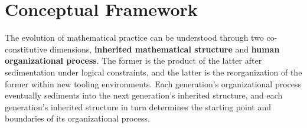\section{Conceptual Framework}

The evolution of mathematical practice can be understood through two co-constitutive dimensions, \textbf{inherited mathematical structure} and \textbf{human organizational process}. The former is the product of the latter after sedimentation under logical constraints, and the latter is the reorganization of the former within new tooling environments. Each generation's organizational process eventually sediments into the next generation's inherited structure, and each generation's inherited structure in turn determines the starting point and boundaries of its organizational process.

